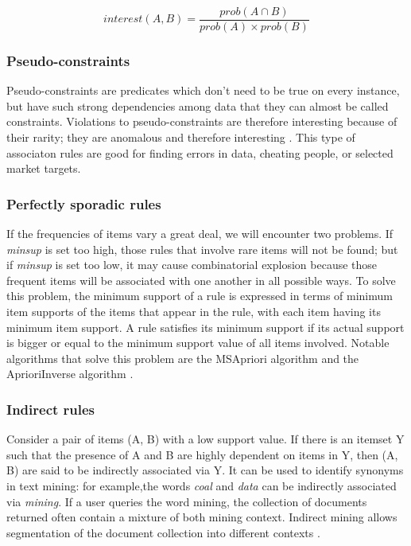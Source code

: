 \begin{equation}\label{eq:interest}
interest(A,B)=\frac{prob(A \cap B)}{prob(A) \times prob(B)}
\end{equation}

\subsubsection*{Pseudo-constraints}
Pseudo-constraints are predicates which don't need to be true on every instance, but have such strong dependencies among data that they can almost be called constraints. Violations to pseudo-constraints are therefore interesting because of their rarity; they are anomalous and therefore interesting \cite{ceri2007mining}. This type of associaton rules are good for finding errors in data, cheating people, or selected market targets.

\subsubsection*{Perfectly sporadic rules}
If the frequencies of items vary a great deal, we will encounter two problems. If \textit{minsup} is set too high, those rules that involve rare items will not be found; but if \textit{minsup} is set too low, it may cause combinatorial explosion because those frequent items will be associated with one another in all possible ways. To solve this problem, the minimum support of a rule is expressed in terms of minimum item supports of the items that appear in the rule, with each item having its minimum item support. A rule satisfies its minimum support if its actual support is bigger or equal to the minimum support value of all items involved. Notable algorithms that solve this problem are the MSApriori algorithm \cite{liu1999mining} and the AprioriInverse algorithm \cite{koh2005finding}.

\subsubsection*{Indirect rules}
Consider a pair of items (A, B) with a low support value. If there is an itemset Y such that the presence of A and B are highly dependent on items in Y, then (A, B) are said to be indirectly associated via Y. It can be used to identify synonyms in text mining: for example,the words \textit{coal} and \textit{data} can be indirectly associated via \textit{mining}. If a user queries the word mining, the collection of documents returned often contain a mixture of both mining context. Indirect mining allows segmentation of the document collection into different contexts \cite{tan2000indirect}. 


